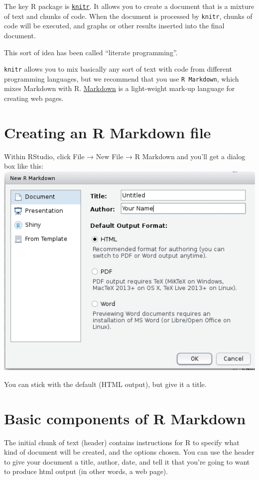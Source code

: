 \documentclass[]{book}
\begin{document}
The key R package is \href{http://yihui.name/knitr/}{\texttt{knitr}}. It
allows you to create a document that is a mixture of text and chunks of
code. When the document is processed by \texttt{knitr}, chunks of code
will be executed, and graphs or other results inserted into the final
document.

This sort of idea has been called ``literate programming''.

\texttt{knitr} allows you to mix basically any sort of text with code
from different programming languages, but we recommend that you use
\texttt{R\ Markdown}, which mixes Markdown with R.
\href{https://www.markdownguide.org/}{Markdown} is a light-weight
mark-up language for creating web pages.

\section{Creating an R Markdown file}\label{creating-an-r-markdown-file}

Within RStudio, click File → New File → R Markdown and you'll get a
dialog box like this: \includegraphics{./fig/New_R_Markdown.png}

You can stick with the default (HTML output), but give it a title.

\section{Basic components of R
Markdown}\label{basic-components-of-r-markdown}

The initial chunk of text (header) contains instructions for R to
specify what kind of document will be created, and the options chosen.
You can use the header to give your document a title, author, date, and
tell it that you're going to want to produce html output (in other
words, a web page).
\end{document}
